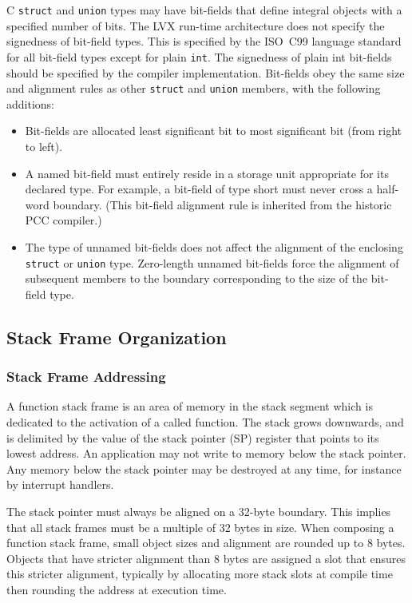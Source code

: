 C \verb|struct| and \verb|union| types may have bit-fields that define integral
objects with a specified number of bits.  The LVX run-time architecture
does not specify the signedness of bit-field types. This is specified by the
ISO~C99 language standard for all bit-field types except for plain \verb|int|.
The signedness of plain int bit-fields should be specified by the compiler
implementation.  Bit-fields obey the same size and alignment rules as other
\verb|struct| and \verb|union| members, with the following additions:
\begin{itemize}

\item Bit-fields are allocated least significant bit to most significant bit
    (from right to left).

\item A named bit-field must entirely reside in a storage unit appropriate for its
    declared type. For example, a bit-field of type short must never cross a
    half-word boundary. (This bit-field alignment rule is inherited from the
    historic PCC compiler.)

\item The type of unnamed bit-fields does not affect the alignment of the enclosing
    \verb|struct| or \verb|union| type.  Zero-length unnamed bit-fields force the
    alignment of subsequent members to the boundary corresponding to the size of
    the bit-field type.

\end{itemize}

\subsection{Stack Frame Organization}

\subsubsection{Stack Frame Addressing}

A function stack frame is an area of memory in the stack segment which is
dedicated to the activation of a called function.  The stack grows downwards,
and is delimited by the value of the stack pointer (SP) register that points to
its lowest address. An application may not write to memory below the stack
pointer.  Any memory below the stack pointer may be destroyed at any time, for
instance by interrupt handlers.  

The stack pointer must always be aligned on a 32-byte boundary.  This implies
that all stack frames must be a multiple of 32 bytes in size. When composing a
function stack frame, small object sizes and alignment are rounded up to 8
bytes. Objects that have stricter alignment than 8 bytes are assigned a slot
that ensures this stricter alignment, typically by allocating more stack slots
at compile time then rounding the address at execution time.

